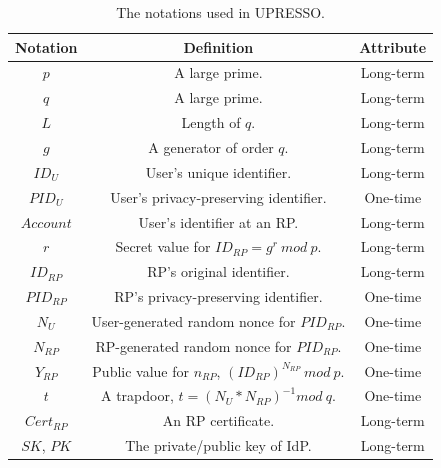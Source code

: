 \begin{table}[tb]
    \caption{The notations used in UPRESSO.}
    \centering
    \begin{tabular}{|c|c|c|}
    \hline
    {Notation} & {Definition} & {Attribute} \\
    \hline
    {$p$} & {A large prime.} & {Long-term} \\
    \hline
    {$q$} & {A large prime.} & {Long-term} \\
    \hline
    {$L$} & {Length of $q$. } & {Long-term} \\
    \hline
    {$g$} & {A generator of order $q$. } & {Long-term} \\
    \hline
    {$ID_U$} & {User's unique identifier.} & {Long-term} \\
    \hline
    {$PID_U$} & {User's privacy-preserving identifier.} & {One-time}\\
    \hline
    {$Account$} & {User's identifier at an RP.} & {Long-term} \\
    \hline
    {$r$} & {Secret value for $ID_{RP}=g^r\ mod\ p$.} & {Long-term} \\
    \hline
    {$ID_{RP}$} & {RP's original identifier.} & {Long-term} \\
    \hline
    {$PID_{RP}$} & {RP's privacy-preserving identifier.} & {One-time} \\
    \hline
    {$N_U$} & {User-generated random nonce for $PID_{RP}$.} & {One-time} \\
    \hline
    {$N_{RP}$} & {RP-generated random nonce for $PID_{RP}$.} & {One-time} \\
    \hline
    {$Y_{RP}$} & {Public value for $n_{RP}$, $(ID_{RP})^{N_{RP}} \ mod\ p$.} & {One-time} \\
    \hline
    {$t$} & {A trapdoor, $t=(N_U*N_{RP})^{-1} mod \ q$.} & {One-time} \\
    \hline
    {$Cert_{RP}$} & {An RP certificate. } & {Long-term} \\
    \hline
    {$SK$, $PK$} & {The private/public key of IdP. } & {Long-term} \\
     \hline
    \end{tabular}
    \label{tbl:notations}
\end{table}


